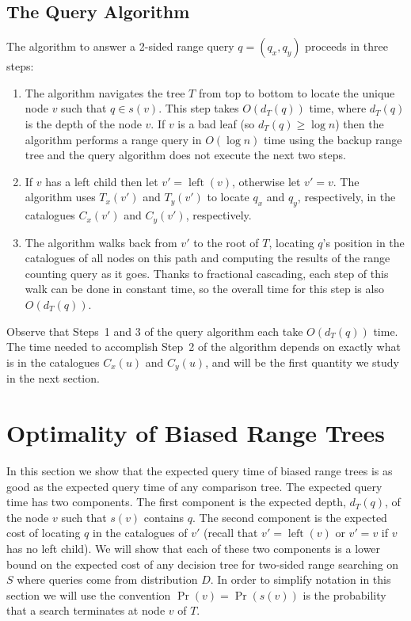 \documentclass{patmorin}
\DeclareMathOperator{\lft}{left}
\begin{document}
\subsection{The Query Algorithm}

The algorithm to answer a 2-sided range query $q=(q_x,q_y)$ proceeds
in three steps:

\begin{enumerate}

\item The algorithm navigates the tree $T$ from top to bottom to
locate the unique node $v$ such that $q\in s(v)$. This step takes
$O(d_T(q))$ time, where $d_T(q)$ is the depth of the node $v$.  If $v$
is a bad leaf (so $d_T(q)\ge \log n$) then the algorithm performs a
range query in $O(\log n)$ time using the backup range tree and the
query algorithm does not execute the next two steps.

\item  If $v$ has a left child then let $v'=\lft(v)$, otherwise let
$v'=v$. The algorithm uses $T_x(v')$ and $T_y(v')$ to locate $q_x$ and
$q_y$, respectively, in the catalogues $C_x(v')$ and $C_y(v')$,
respectively.

\item The algorithm walks back from $v'$ to the root of $T$, locating
$q$'s position in the catalogues of all nodes on this path and computing
the results of the range counting query as it goes.  Thanks to fractional
cascading, each step of this walk can be done in constant time, so the
overall time for this step is also $O(d_T(q))$.
\end{enumerate}

Observe that Steps~1 and 3 of the query algorithm each take
$O(d_T(q))$ time.  The time needed to accomplish Step~2 of the
algorithm depends on exactly what is in the catalogues $C_x(u)$ and
$C_y(u)$, and will be the first quantity we study in the next section.

\section{Optimality of Biased Range Trees}

In this section we show that the expected query time of biased range
trees is as good as the expected query time of any comparison tree.
The expected query time has two components.  The first component is
the expected depth, $d_T(q)$,  of the node $v$ such that $s(v)$
contains $q$.  The second component is the expected cost of locating
$q$ in the catalogues of $v'$ (recall that $v'=\lft(v)$ or $v'=v$ if $v$
has no left child).  We will show that each of these two components
is a lower bound on the expected cost of any decision tree for
two-sided range searching on $S$ where queries come from distribution
$D$.  In order to simplify notation in this section we will use the
convention $\Pr(v)=\Pr(s(v))$ is the probability that a search
terminates at node $v$ of $T$.  
\end{document}
